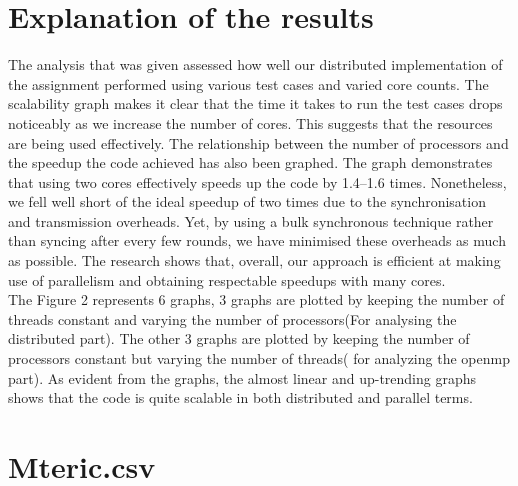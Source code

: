 \documentclass{article}
\begin{document}
\newpage

\section{Explanation of the results}
The analysis that was given assessed how well our distributed implementation of the assignment performed using various test cases and varied core counts. The scalability graph makes it clear that the time it takes to run the test cases drops noticeably as we increase the number of cores. This suggests that the resources are being used effectively. The relationship between the number of processors and the speedup the code achieved has also been graphed. The graph demonstrates that using two cores effectively speeds up the code by 1.4–1.6 times. Nonetheless, we fell well short of the ideal speedup of two times due to the synchronisation and transmission overheads. Yet, by using a bulk synchronous technique rather than syncing after every few rounds, we have minimised these overheads as much as possible. The research shows that, overall, our approach is efficient at making use of parallelism and obtaining respectable speedups with many cores.
\\
The Figure 2 represents 6 graphs, 3 graphs are plotted by keeping the number of threads constant and varying the number of processors(For analysing the distributed part). The other 3 graphs are plotted by keeping the number of processors constant but varying the number of threads( for analyzing the openmp part). As evident from the graphs, the almost linear and up-trending graphs shows that the code is quite scalable in both distributed and parallel terms.

\section{Mteric.csv}
\end{document}
